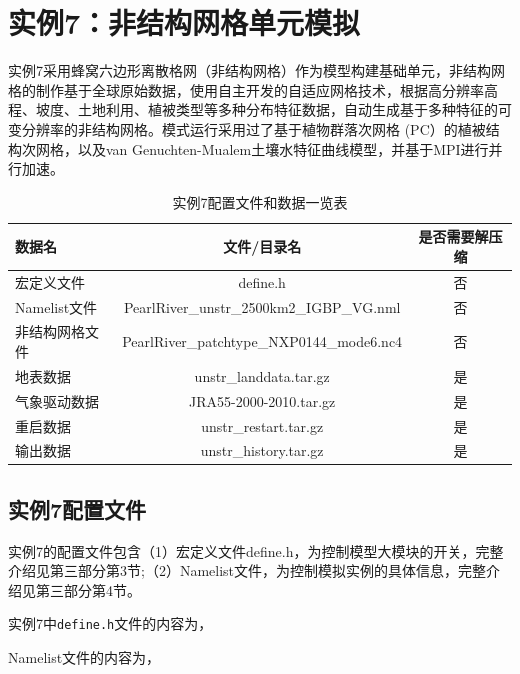\section{实例7：非结构网格单元模拟}

实例7采用蜂窝六边形离散格网（非结构网格）作为模型构建基础单元，非结构网格的制作基于全球原始数据，使用自主开发的自适应网格技术，根据高分辨率高程、坡度、土地利用、植被类型等多种分布特征数据，自动生成基于多种特征的可变分辨率的非结构网格。模式运行采用过了基于植物群落次网格 (PC）的植被结构次网格，以及van Genuchten-Mualem土壤水特征曲线模型，并基于MPI进行并行加速。

\begin{table}[htbp]
\caption{实例7配置文件和数据一览表}
\centering \renewcommand{\arraystretch}{1.5}
\label{unstrtable}
\begin{tabular}{lcc}
\toprule
\textbf{数据名} & \textbf{文件/目录名} & \textbf{是否需要解压缩} \\\midrule
宏定义文件 & define.h & 否 \\
Namelist文件 & PearlRiver\_unstr\_2500km2\_IGBP\_VG.nml & 否 \\
非结构网格文件 & PearlRiver\_patchtype\_NXP0144\_mode6.nc4 & 否\\
地表数据 & unstr\_landdata.tar.gz & 是 \\
气象驱动数据 & JRA55-2000-2010.tar.gz & 是 \\
重启数据 & unstr\_restart.tar.gz & 是 \\
输出数据 & unstr\_history.tar.gz & 是 \\

\bottomrule
\end{tabular}
\end{table}
\subsection{实例7配置文件}
实例7的配置文件包含（1）宏定义文件define.h，为控制模型大模块的开关，完整介绍见第三部分第3节;（2）Namelist文件，为控制模拟实例的具体信息，完整介绍见第三部分第4节。

实例7中\texttt{define.h}文件的内容为，


Namelist文件的内容为，


